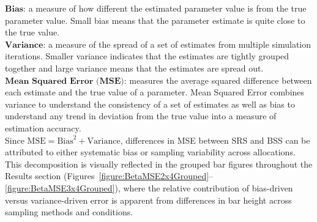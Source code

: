 \documentclass{article}[11pt]
\begin{document}

\noindent $\textbf{Bias}$: a measure of how different the estimated parameter value is from the true parameter value. Small bias means that the parameter estimate is quite close to the true value.\\

\noindent $\textbf{Variance}$: a measure of the spread of a set of estimates from multiple simulation iterations. Smaller variance indicates that the estimates are tightly grouped together and large variance means that the estimates are spread out.\\

\noindent $\textbf{Mean Squared Error (MSE)}$: measures the average squared difference between each estimate and the true value of a parameter. Mean Squared Error combines variance to understand the consistency of a set of estimates as well as bias to understand any trend in deviation from the true value into a measure of estimation accuracy.\\

Since $\text{MSE} = \text{Bias}^2 + \text{Variance}$, differences in MSE between SRS and BSS can be attributed to either systematic bias or sampling variability across allocations. This decomposition is visually reflected in the grouped bar figures throughout the Results section (Figures~\ref{figure:BetaMSE2x4Grouped}--\ref{figure:BetaMSE3x4Grouped}), where the relative contribution of bias-driven versus variance-driven error is apparent from differences in bar height across sampling methods and conditions.
\end{document}
